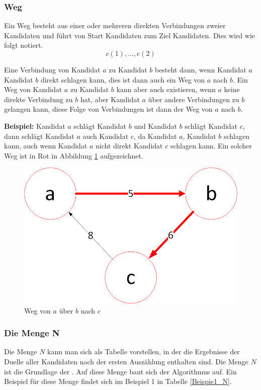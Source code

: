 \newpage
\subsubsection{Weg}
\label{weg}
Ein Weg besteht aus einer oder mehreren direkten Verbindungen zweier Kandidaten und führt von Start Kandidaten zum Ziel Kandidaten. Dies wird wie folgt notiert.
\[
c(1),...,c(2)
\]

Eine Verbindung von Kandidat $a$ zu Kandidat $b$ besteht dann, wenn Kandidat $a$ Kandidat $b$ direkt schlagen kann, dies ist dann auch ein Weg von $a$ nach $b$. Ein Weg von Kandidat $a$ zu Kandidat $b$ kann aber auch existieren, wenn $a$ keine direkte Verbindung zu $b$ hat, aber Kandidat $a$ über andere Verbindungen zu $b$ gelangen kann, diese Folge von Verbindungen ist dann der Weg von $a$ nach $b$. 

\textbf{Beispiel:} Kandidat $a$ schlägt Kandidat $b$ und Kandidat $b$ schlägt Kandidat $c$, dann schlägt Kandidat $a$ auch Kandidat $c$, da Kandidat $a$, Kandidat $b$ schlagen kann, auch wenn Kandidat $a$ nicht direkt Kandidat $c$ schlagen kann. Ein solcher Weg ist in Rot in Abbildung \ref{fig:weg} aufgezeichnet. 

\begin{figure}[!h]
\centering
\includegraphics[scale=0.5]{Bilder/Weg.png}
\caption{Weg von $a$ über $b$ nach $c$}
\label{fig:weg}
\end{figure}

\subsubsection{Die Menge N}
\label{mengeN}
Die Menge $N$ kann man sich als Tabelle vorstellen, in der die Ergebnisse der Duelle aller Kandidaten nach der ersten Auszählung enthalten sind. Die Menge $N$ ist die Grundlage der \schulze. Auf diese Menge baut sich der Algorithmus auf. Ein Beispiel für diese Menge findet sich im Beispiel 1 in Tabelle \ref{Beispie1_N}.

